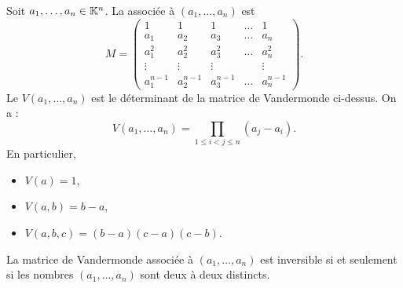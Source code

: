 \documentclass{book}
\begin{document}
\begin{Exemple}

Soit $a_1,\dots,a_n \in  \mathbb{K} ^n$.
La  associée à $(a_1,\dots,a_n)$ est
\[ M = \begin{pmatrix}
    1 &  1 &  1 &  \dots &  1  \\
    a_1 &  a_2 &  a_3 &  \dots &  a_n  \\
    a_1^2 &  a_2^2 &  a_3^2 &  \dots &  a_n^2  \\
    \vdots &  \vdots &  \vdots &   &  \vdots  \\
a_1^{n-1} &  a_2^{n-1} &  a_3^{n-1} &  \dots &  a_n^{n-1}  \end{pmatrix}. \]
Le  $V(a_1,\dots,a_n)$ est le déterminant de la matrice de Vandermonde ci-dessus. On a :
$$V(a_1,\dots,a_n) = \prod_{1\leq i < j\leq n} (a_j - a_i). $$
En particulier,
\begin{itemize}
\item $V(a) = 1$,
\item $V(a,b) = b-a$,
\item $V(a,b,c) = (b-a)(c-a)(c-b)$.
\end{itemize}
La matrice de Vandermonde associée à $(a_1,\dots,a_n)$ est inversible si et seulement si les nombres $(a_1,\dots,a_n)$ sont deux à deux distincts.
\end{Exemple}
\end{document}
